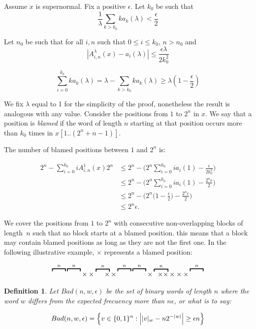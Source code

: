 \documentclass[11pt,a4paper]{tesis}
\newtheorem{definition}{Definition}[]
\begin{document}
Assume  $x$ is supernormal.
Fix a positive $\epsilon$.
Let $k_0$ be such that 
$$\frac{1}{\lambda} \sum_{k > k_0} ka_k(\lambda) < \frac{\epsilon}{2}$$

Let $n_0$ be  such that  for all 
$ i,n$ such that $  0 \leq i \leq k_0 $, $n > n_0$ and 
  $$|A^\lambda_{i,n}(x) - a_i(\lambda)| \leq \frac{\epsilon\lambda}{2k_0^2}$$


 $$\sum_{i=0}^{k_0} ka_k(\lambda) = \lambda - \sum_{k> k_0} ka_k(\lambda) \geq \lambda(1 - \frac{\epsilon}{2})$$

We fix $\lambda$ equal to 1 for the simplicity of the proof, nonetheless the result is analogous with any value.
Consider the positions from $1$ to $ 2^n $ in $x$. 
We say that a position is \textit{blamed} if the word of length $n$ starting at that position 
occurs more than $k_0$ times in 
 $x[1..(2^n+n-1)]$. 

 The number of blamed positions 
 between  $1$ and $2^n$ is:

\begin{align*}
   2^n -  \sum_{i=0}^{k_0} iA^{1}_{i,n}(x) 2^n 
     &\leq 2^n - \Big(2^n\sum_{i=0}^{k_0} i a_i(1) - \frac{\epsilon}{2k^2_0}\Big) \\
    &\leq 2^n -  \Big(2^n \sum_{i=0}^{k_0} ia_{i}(1) - \frac{2^n\epsilon}{2} \Big)\\
    &\leq 2^n - \Big(2^n \big(1-\frac{\epsilon}{2}\big) - \frac{2^n\epsilon }{2}\Big) \\
    &\leq 2^n\epsilon.
\end{align*}

We cover the positions from $1 $ to $2^n$ with consecutive
 non-overlapping blocks of length~$n$ such that 
no block starts at a blamed  position. 
this means that a block may contain blamed positions as long as they are not the first one. In the following illustrative example, $\times$ represents a blamed position:
 
$$\overbracket{\raisebox{6.4pt}{\qquad}}^{n} \overbracket{\raisebox{6.4pt}{\qquad}}^{n}\times\times\overbracket{\;\quad \times}^{n} \times \overbracket{\raisebox{6.4pt}{\qquad}}^{n} \overbracket{\raisebox{6.4pt}{\qquad}}^{n} \times \overbracket{\;\; \times \times}^{n} \times\times\times \overbracket{\raisebox{6.4pt}{\qquad}}^{n}$$


\begin{definition}
  Let $Bad(n, w, \epsilon)$ be the set of binary words of length $n$ where the word $w$ differs from the expected frecuency more than $n \epsilon$, or what is to say:

  $$Bad(n, w, \epsilon)=\Big{\{}v\in \{0,1\}^n: \Big{|} |v|_w - n 2^{-|w|} \Big{|} \geq \epsilon n \Big{\} }$$
\end{definition}
\end{document}
